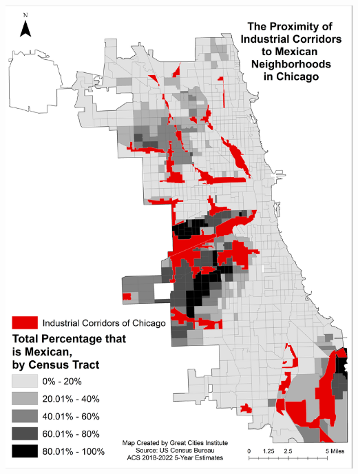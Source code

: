 \documentclass[
]{article}
\begin{document}
\includegraphics[width=75in]{Data Tables/MexicansChicago_IndustrialCorridors}

\clearpage
\end{document}
